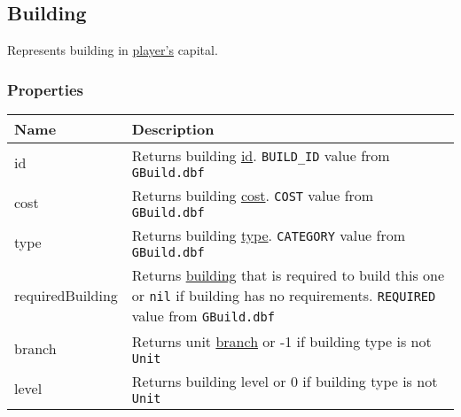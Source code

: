 \subsection{Building}
\label{Building}
Represents building in \hyperref[Player]{player's} capital.
\subsubsection{Properties}
\begin{center}
\begin{tabularx}{\linewidth}{| l | X |}
\hline
\textbf{Name} & \textbf{Description} \\
\hline
id & Returns building \hyperref[Id]{id}. \texttt{BUILD\_ID} value from \texttt{GBuild.dbf}\\
cost & Returns building \hyperref[Currency]{cost}. \texttt{COST} value from \texttt{GBuild.dbf}\\
type & Returns building \hyperref[BuildingCategory]{type}. \texttt{CATEGORY} value from \texttt{GBuild.dbf}\\
requiredBuilding & Returns \hyperref[Building]{building} that is required to build this one or \texttt{nil} if building has no requirements. \texttt{REQUIRED} value from \texttt{GBuild.dbf}\\
branch & Returns unit \hyperref[UnitBranch]{branch} or -1 if building type is not \texttt{Unit}\\
level & Returns building level or 0 if building type is not \texttt{Unit}\\
\hline
\end{tabularx}
\end{center}
